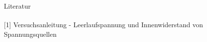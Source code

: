 \parskip 8pt
\Large{Literatur}\\\\
\large{[1] Versuchsanleitung - Leerlaufspannung und Innenwiderstand von Spannungsquellen}




